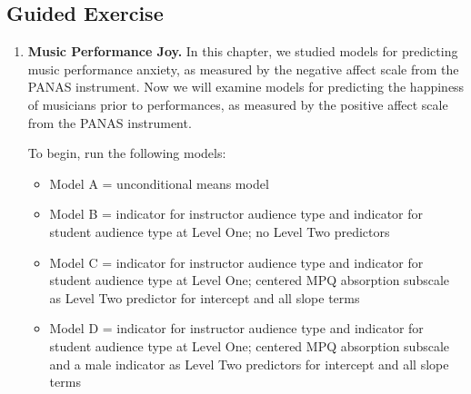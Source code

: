 \documentclass[
]{krantz}
\providecommand{\tightlist}{%
  \setlength{\itemsep}{0pt}\setlength{\parskip}{0pt}}
\begin{document}
\hypertarget{guided-exercise}{%
\subsection{Guided Exercise}\label{guided-exercise}}

\begin{enumerate}
\def\labelenumi{\arabic{enumi}.}
\item
  \textbf{Music Performance Joy.} In this chapter, we studied models for predicting music performance anxiety, as measured by the negative affect scale from the PANAS instrument. Now we will examine models for predicting the happiness of musicians prior to performances, as measured by the positive affect scale from the PANAS instrument.

  To begin, run the following models:

  \begin{itemize}
  \tightlist
  \item
    Model A = unconditional means model
  \item
    Model B = indicator for instructor audience type and indicator for student audience type at Level One;
    no Level Two predictors
  \item
    Model C = indicator for instructor audience type and indicator for student audience type at Level One;
    centered MPQ absorption subscale as Level Two predictor for intercept and all slope terms
  \item
    Model D = indicator for instructor audience type and indicator for student audience type at Level One;
    centered MPQ absorption subscale and a male indicator as Level Two predictors for intercept and all slope terms
  \end{itemize}


\end{enumerate}
\end{document}
